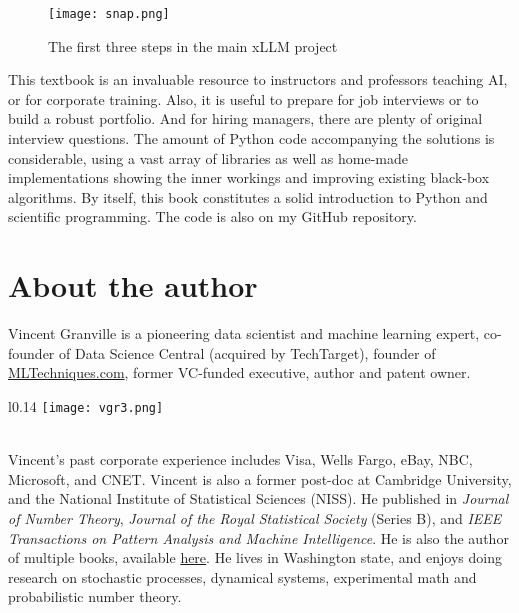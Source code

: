 \documentclass[oneside,10pt]{book}
\begin{document}
\begin{figure}[H]
\centering
\texttt{[image: snap.png]}   
\caption{The first three steps in the main xLLM project}
\label{fig:scgh4aslo}
\end{figure}


This textbook is an invaluable resource to instructors and professors teaching AI, or for corporate training. Also, it is useful to prepare for job interviews or to build a robust portfolio. And for hiring managers, there are plenty of original interview questions. The amount of Python code accompanying the solutions is considerable, using a vast array of libraries as well as home-made implementations showing the inner workings and improving existing black-box algorithms. By itself, this book constitutes a solid introduction to Python and scientific programming. The code is also on my GitHub repository.



\section*{About the author}

Vincent Granville is a pioneering data scientist and machine learning expert, co-founder of Data Science Central  (acquired by TechTarget), founder of \href{https://mltechniques.com/}{MLTechniques.com}, former VC-funded executive, author and patent owner.
\begin{wrapfigure}{l}{0.14\textwidth}
\vspace{-1ex}
\texttt{[image: vgr3.png]} 
\end{wrapfigure}
\vspace{-2ex}\quad \\
\noindent Vincent’s past corporate experience includes Visa, Wells Fargo, eBay, NBC, Microsoft, and CNET. 
Vincent is also a former post-doc at Cambridge University, and the National Institute of Statistical Sciences (NISS).  
He  published in {\em Journal of Number Theory}, {\em Journal of the Royal Statistical Society} (Series B), and {\em IEEE Transactions on Pattern Analysis and Machine Intelligence}. He is also the author of multiple books, available \href{https://mltechniques.com/resources/}{here}. He lives  in Washington state, and enjoys doing research on stochastic processes, dynamical systems, experimental math and probabilistic number theory.
\end{document}
